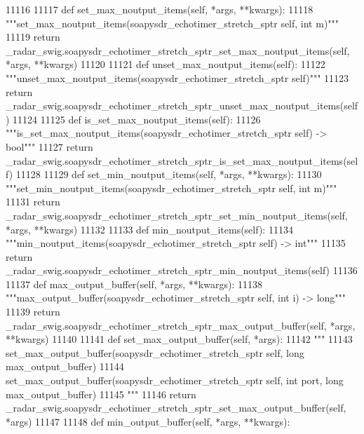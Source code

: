 \begin{DoxyCode}
{{{{{{{{{{{{{{{{{{{{{{{{{{{{{{{{{{{11116 
11117     \textcolor{keyword}{def }set_max_noutput_items(self, *args, **kwargs):
11118         \textcolor{stringliteral}{"""set\_max\_noutput\_items(soapysdr\_echotimer\_stretch\_sptr self, int m)"""}
11119         \textcolor{keywordflow}{return} \_radar\_swig.soapysdr\_echotimer\_stretch\_sptr\_set\_max\_noutput\_items(self, *args, **kwargs)
11120 
11121     \textcolor{keyword}{def }unset_max_noutput_items(self):
11122         \textcolor{stringliteral}{"""unset\_max\_noutput\_items(soapysdr\_echotimer\_stretch\_sptr self)"""}
11123         \textcolor{keywordflow}{return} \_radar\_swig.soapysdr\_echotimer\_stretch\_sptr\_unset\_max\_noutput\_items(self)
11124 
11125     \textcolor{keyword}{def }is_set_max_noutput_items(self):
11126         \textcolor{stringliteral}{"""is\_set\_max\_noutput\_items(soapysdr\_echotimer\_stretch\_sptr self) -> bool"""}
11127         \textcolor{keywordflow}{return} \_radar\_swig.soapysdr\_echotimer\_stretch\_sptr\_is\_set\_max\_noutput\_items(self)
11128 
11129     \textcolor{keyword}{def }set_min_noutput_items(self, *args, **kwargs):
11130         \textcolor{stringliteral}{"""set\_min\_noutput\_items(soapysdr\_echotimer\_stretch\_sptr self, int m)"""}
11131         \textcolor{keywordflow}{return} \_radar\_swig.soapysdr\_echotimer\_stretch\_sptr\_set\_min\_noutput\_items(self, *args, **kwargs)
11132 
11133     \textcolor{keyword}{def }min_noutput_items(self):
11134         \textcolor{stringliteral}{"""min\_noutput\_items(soapysdr\_echotimer\_stretch\_sptr self) -> int"""}
11135         \textcolor{keywordflow}{return} \_radar\_swig.soapysdr\_echotimer\_stretch\_sptr\_min\_noutput\_items(self)
11136 
11137     \textcolor{keyword}{def }max_output_buffer(self, *args, **kwargs):
11138         \textcolor{stringliteral}{"""max\_output\_buffer(soapysdr\_echotimer\_stretch\_sptr self, int i) -> long"""}
11139         \textcolor{keywordflow}{return} \_radar\_swig.soapysdr\_echotimer\_stretch\_sptr\_max\_output\_buffer(self, *args, **kwargs)
11140 
11141     \textcolor{keyword}{def }set_max_output_buffer(self, *args):
11142         \textcolor{stringliteral}{"""}
11143 \textcolor{stringliteral}{        set\_max\_output\_buffer(soapysdr\_echotimer\_stretch\_sptr self, long max\_output\_buffer)}
11144 \textcolor{stringliteral}{        set\_max\_output\_buffer(soapysdr\_echotimer\_stretch\_sptr self, int port, long max\_output\_buffer)}
11145 \textcolor{stringliteral}{        """}
11146         \textcolor{keywordflow}{return} \_radar\_swig.soapysdr\_echotimer\_stretch\_sptr\_set\_max\_output\_buffer(self, *args)
11147 
11148     \textcolor{keyword}{def }min_output_buffer(self, *args, **kwargs):
}}}}}}}}}}}}}}}}}}}}}}}}}}}}}}}}}}}
\end{DoxyCode}
